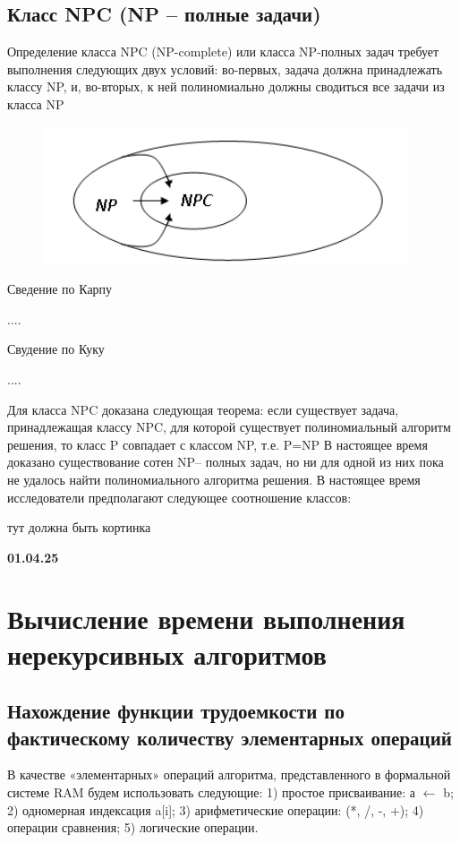 \documentclass{article}
\begin{document}
  \subsection{Класс NPC (NP – полные задачи)}

  Определение класса NPC (NP-complete) или класса NP-полных задач
   требует выполнения следующих двух условий: во-первых,
    задача должна принадлежать классу NP, и, во-вторых,
     к ней полиномиально должны сводиться все задачи из класса NP

     \begin{figure} [H]
        \includegraphics[width=0.50\linewidth]{Снимок экрана 2025-03-25 093930.png}
    \end{figure}



    Сведение по Карпу

    ....

    Свудение по Куку

....

    Для класса NPC доказана следующая теорема:
     если существует задача, принадлежащая классу NPC,
      для которой существует полиномиальный алгоритм решения, то класс P совпадает с классом NP, т.е. P=NP
	В настоящее время доказано существование сотен NP– полных задач,
     но ни для одной из них пока не удалось найти полиномиального алгоритма решения.
      В настоящее время исследователи предполагают следующее соотношение классов:

      тут должна быть кортинка


\textbf{01.04.25}



\section{Вычисление времени выполнения нерекурсивных алгоритмов}
\subsection{Нахождение функции трудоемкости по фактическому количеству элементарных операций}


В качестве «элементарных» операций алгоритма, представленного 
в формальной системе RAM будем использовать следующие:
1) простое присваивание: а $\leftarrow$ b;
2) одномерная индексация a[i];
3) арифметические операции: (*, /, -, +);
4) операции сравнения;
5) логические операции. 
\end{document}
